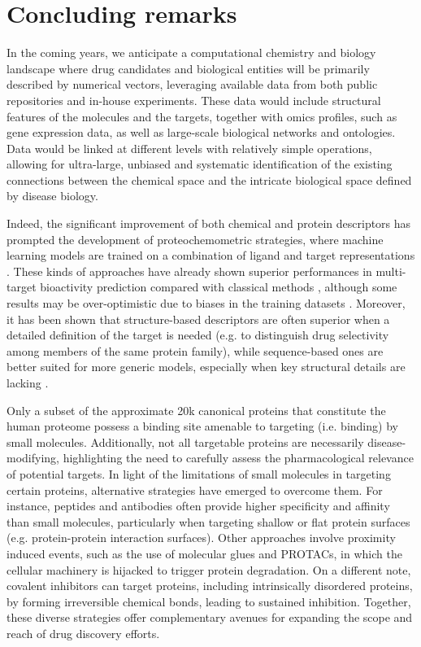 \chapter{Concluding remarks}
\label{concluding}
\clearpage

In the coming years, we anticipate a computational chemistry and biology landscape where drug candidates and biological entities will be primarily described by numerical vectors, leveraging available data from both public repositories and in-house experiments. These data would include structural features of the molecules and the targets, together with omics profiles, such as gene expression data, as well as large-scale biological networks and ontologies. Data would be linked at different levels with relatively simple operations, allowing for ultra-large, unbiased and systematic identification of the existing connections between the chemical space and the intricate biological space defined by disease biology. 

Indeed, the significant improvement of both chemical and protein descriptors has prompted the development of proteochemometric strategies, where machine learning models are trained on a combination of ligand and target representations \cite{bongers_proteochemometrics_2019}. These kinds of approaches have already shown superior performances in multi-target bioactivity prediction compared with classical methods \cite{torng_graph_2019}, although some results may be over-optimistic due to biases in the training datasets \cite{chen_hidden_2019}. Moreover, it has been shown that structure-based descriptors are often superior when a detailed definition of the target is needed (e.g. to distinguish drug selectivity among members of the same protein family), while sequence-based ones are better suited for more generic models, especially when key structural details are lacking \cite{bongers_proteochemometrics_2019}.

Only a subset of the approximate 20k canonical proteins that constitute the human proteome possess a binding site amenable to targeting (i.e. binding) by small molecules. Additionally, not all targetable proteins are necessarily disease-modifying, highlighting the need to carefully assess the pharmacological relevance of potential targets. In light of the limitations of small molecules in targeting certain proteins, alternative strategies have emerged to overcome them. For instance, peptides and antibodies often provide higher specificity and affinity than small molecules, particularly when targeting shallow or flat protein surfaces (e.g. protein-protein interaction surfaces). Other approaches involve proximity induced events, such as the use of molecular glues and PROTACs, in which the cellular machinery is hijacked to trigger protein degradation. On a different note, covalent inhibitors can target proteins, including intrinsically disordered proteins, by forming irreversible chemical bonds, leading to sustained inhibition. Together, these diverse strategies offer complementary avenues for expanding the scope and reach of drug discovery efforts. 

